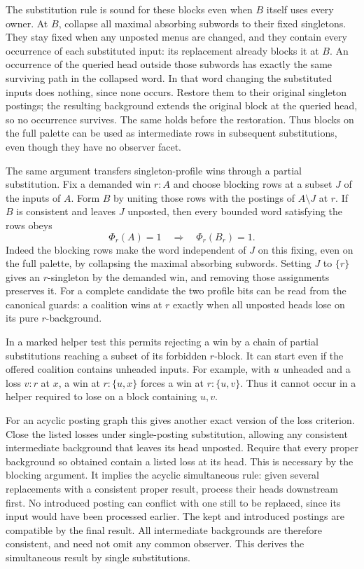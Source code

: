The substitution rule is sound for these blocks even
when $B$ itself uses every owner. At $B$, collapse all
maximal absorbing subwords to their fixed singletons.
They stay fixed when any unposted menus are changed,
and they contain every occurrence of each substituted
input: its replacement already blocks it at $B$.
An occurrence of the queried head outside those subwords
has exactly the same surviving path in the collapsed
word. In that word changing the substituted inputs
does nothing, since none occurs. Restore them to their
original singleton postings; the resulting background
extends the original block at the queried head, so no
occurrence survives. The same holds before the restoration.
Thus blocks on the full palette can be used as intermediate
rows in subsequent substitutions, even though they have
no observer facet.

The same argument transfers singleton-profile wins
through a partial substitution. Fix a demanded win
$r:A$ and choose blocking rows at a subset $J$ of
the inputs of $A$. Form $B$ by uniting those rows
with the postings of $A\setminus J$ at $r$.
If $B$ is consistent and leaves $J$ unposted, then
every bounded word satisfying the rows obeys
\[
                 \Phi_r(A)=1\quad\Longrightarrow\quad
                 \Phi_r(B_r)=1 .
\]
Indeed the blocking rows make the word independent
of $J$ on this fixing, even on the full palette, by
collapsing the maximal absorbing subwords. Setting
$J$ to $\{r\}$ gives an $r$-singleton by the demanded
win, and removing those assignments preserves it.
For a complete candidate the two profile bits can
be read from the canonical guards: a coalition wins
at $r$ exactly when all unposted heads lose on its
pure $r$-background.

In a marked helper test this permits rejecting a win
by a chain of partial substitutions reaching a subset
of its forbidden $r$-block. It can start even if
the offered coalition contains unheaded inputs.
For example, with $u$ unheaded and a loss $v:r$ at
$x$, a win at $r:\{u,x\}$ forces a win at
$r:\{u,v\}$. Thus it cannot occur in a helper required
to lose on a block containing $u,v$.

For an acyclic posting graph this gives another exact
version of the loss criterion. Close the listed losses
under single-posting substitution, allowing any consistent
intermediate background that leaves its head unposted.
Require that every proper background so obtained contain
a listed loss at its head. This is necessary by the
blocking argument. It implies the acyclic simultaneous
rule: given several replacements with a consistent proper
result, process their heads downstream first. No introduced
posting can conflict with one still to be replaced, since
its input would have been processed earlier. The kept and
introduced postings are compatible by the final result.
All intermediate backgrounds are therefore consistent,
and need not omit any common observer. This derives the
simultaneous result by single substitutions.

